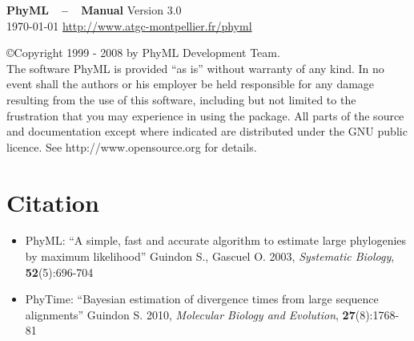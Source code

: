 \documentclass[a4paper,12pt]{article}
\begin{document}
\sloppy
\begin{center}
\thispagestyle{empty}
\vfill\vfill
{\Huge \textbf{ PhyML~~--~~Manual}}
\vfill
{\huge Version 3.0 \\
\today
\vfill
\href{http://www.atgc-montpellier.fr/phyml}{http://www.atgc-montpellier.fr/phyml}}
\end{center}
\clearpage
\tableofcontents
\clearpage

{\par
\small 
\noindent
\copyright Copyright 1999 - 2008 by PhyML Development Team.\\
\noindent The software PhyML is provided ``as is''  without warranty of any kind.  In no event shall
the authors  or his  employer be  held responsible  for any damage  resulting from  the use  of this
software, including but not limited to the frustration that you may experience in using the package.
All parts of the source and documentation except where indicated are distributed under
the GNU public licence. See http://www.opensource.org for details.

}

{
\noindent
\setlength{\baselineskip}{0.5\baselineskip}
\section{Citation}
\begin{itemize}
\item PhyML: ``A simple, fast and accurate algorithm to estimate large phylogenies by maximum likelihood''
  Guindon S., Gascuel O. 2003, {\it Systematic Biology}, {\bf \small 52}(5):696-704
\item PhyTime: ``Bayesian estimation of divergence times from large sequence alignments'' Guindon
  S. 2010, {\it Molecular Biology and Evolution}, {\bf \small 27}(8):1768-81
\end{itemize}
}
\end{document}
